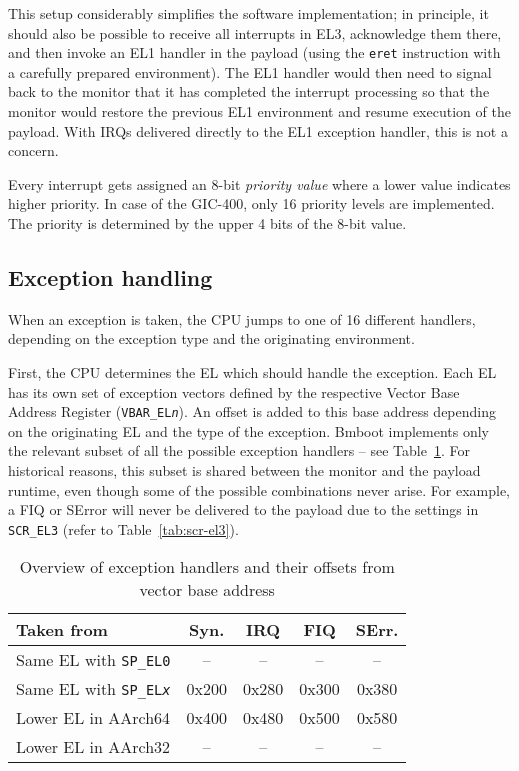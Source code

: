 This setup considerably simplifies the software implementation; in principle, it should also be possible to receive all interrupts in EL3, acknowledge them there, and then invoke an EL1 handler in the payload (using the \texttt{eret} instruction with a carefully prepared environment). The EL1 handler would then need to signal back to the monitor that it has completed the interrupt processing so that the monitor would restore the previous EL1 environment and resume execution of the payload. With IRQs delivered directly to the EL1 exception handler, this is not a concern.

Every interrupt gets assigned an 8-bit \textit{priority value} where a lower value indicates higher priority. In case of the GIC-400, only 16 priority levels are implemented. The priority is determined by the upper 4 bits of the 8-bit value.

\subsection{Exception handling}

When an exception is taken, the CPU jumps to one of 16 different handlers, depending on the exception type and the originating environment.

First, the CPU determines the EL which should handle the exception. Each EL has its own set of exception vectors defined by the respective Vector Base Address Register (\texttt{VBAR\_EL\textit{n}}). An offset is added to this base address depending on the originating EL and the type of the exception. Bmboot implements only the relevant subset of all the possible exception handlers -- see Table~\ref{tab:exc-handlers}. For historical reasons, this subset is shared between the monitor and the payload runtime, even though some of the possible combinations never arise. For example, a FIQ or SError will never be delivered to the payload due to the settings in \texttt{SCR\_EL3} (refer to Table~\ref{tab:scr-el3}).


\begin{table}[h]
  \centering
  \begin{tabular}{lcccc}\toprule
  \textbf{Taken from} & \textbf{Syn.} & \textbf{IRQ} & \textbf{FIQ} & \textbf{SErr.} \\\midrule
  Same EL with \texttt{SP\_EL0} & -- & -- & -- & -- \\
  Same EL with \texttt{SP\_EL\textit{x}} & 0x200 & 0x280 & 0x300 & 0x380 \\
  Lower EL in AArch64 & 0x400 & 0x480 & 0x500 & 0x580 \\
  Lower EL in AArch32 & -- & -- & -- & -- \\\bottomrule
  \end{tabular}

  \caption{Overview of exception handlers and their offsets from vector base address}
  \label{tab:exc-handlers}
\end{table}

